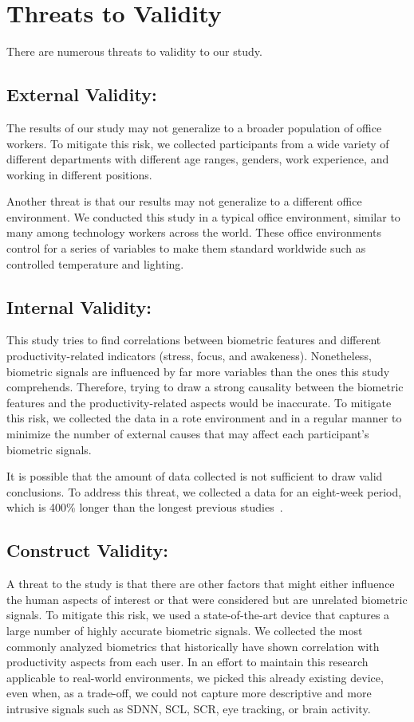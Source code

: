 \section{Threats to Validity}
There are numerous threats to validity to our study.

\subsection{External Validity:}
The results of our study may 
 not generalize to a broader population of office workers.
To mitigate this risk, we collected participants
from a wide variety of different departments
with different age ranges, genders, work experience, and 
working in different positions.

Another threat is that our results may not generalize
to a different office environment. We conducted
this study in a typical office environment, similar to many
among technology workers across the world.
These office environments control for a series of
variables to make them standard worldwide such
as controlled temperature and lighting.

\subsection{Internal Validity:}
This study tries to find correlations between
biometric features and different productivity-related indicators (stress, focus, and awakeness).
Nonetheless, biometric signals are influenced by far more
variables than the ones this study comprehends.
Therefore, trying to draw a strong causality between the biometric
features and the productivity-related aspects would be inaccurate.
To mitigate this risk,  we collected the data
in a rote environment and in a regular manner 
to minimize the number of 
external causes that may affect each participant's
biometric signals.

It is possible that the amount of data collected
is not sufficient
to draw valid conclusions. To address this threat, 
we collected a data for an eight-week period, which is
400\% longer than the longest previous studies~\cite{zuger18,Muller16}.


\subsection{Construct Validity:}
A threat to the study is that
there are other factors that might either influence the
human aspects of interest or that were considered but
are unrelated biometric signals.
To mitigate this risk, we used a state-of-the-art
device that captures a large number of highly accurate biometric
signals. We collected the most commonly analyzed
biometrics that historically have shown correlation with 
productivity aspects from each user.
In an effort to maintain this research applicable to real-world environments, we picked this already existing device, even when, as a trade-off, we could not capture more descriptive and more intrusive signals such as SDNN, SCL, SCR, eye tracking, or brain activity.

